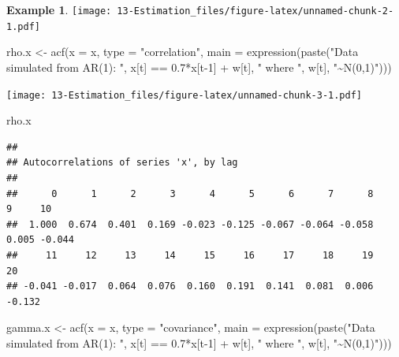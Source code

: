 \documentclass[
]{book}
\newenvironment{Shaded}{\begin{snugshade}}{\end{snugshade}}
\newcommand{\AttributeTok}[1]{\textcolor[rgb]{0.77,0.63,0.00}{#1}}
\newcommand{\DecValTok}[1]{\textcolor[rgb]{0.00,0.00,0.81}{#1}}
\newcommand{\FloatTok}[1]{\textcolor[rgb]{0.00,0.00,0.81}{#1}}
\newcommand{\FunctionTok}[1]{\textcolor[rgb]{0.00,0.00,0.00}{#1}}
\newcommand{\NormalTok}[1]{#1}
\newcommand{\OtherTok}[1]{\textcolor[rgb]{0.56,0.35,0.01}{#1}}
\newcommand{\SpecialCharTok}[1]{\textcolor[rgb]{0.00,0.00,0.00}{#1}}
\newcommand{\StringTok}[1]{\textcolor[rgb]{0.31,0.60,0.02}{#1}}
\theoremstyle{definition}
\theoremstyle{definition}
\newtheorem{example}{Example}[chapter]
\theoremstyle{definition}
\theoremstyle{definition}
\theoremstyle{remark}
\begin{document}
\begin{example}
\texttt{[image: 13-Estimation\_files/figure-latex/unnamed-chunk-2-1.pdf]}

\begin{Shaded}
\begin{Highlighting}[]
\NormalTok{rho.x }\OtherTok{\textless{}{-}} \FunctionTok{acf}\NormalTok{(}\AttributeTok{x =}\NormalTok{ x, }\AttributeTok{type =} \StringTok{"correlation"}\NormalTok{, }\AttributeTok{main =} 
    \FunctionTok{expression}\NormalTok{(}\FunctionTok{paste}\NormalTok{(}\StringTok{"Data simulated from AR(1): "}\NormalTok{, x[t] }\SpecialCharTok{==} \FloatTok{0.7}\SpecialCharTok{*}\NormalTok{x[t}\DecValTok{{-}1}\NormalTok{] }\SpecialCharTok{+}\NormalTok{ w[t], }\StringTok{" where "}\NormalTok{, w[t], }\StringTok{"\textasciitilde{}N(0,1)"}\NormalTok{)))}
\end{Highlighting}
\end{Shaded}

\texttt{[image: 13-Estimation\_files/figure-latex/unnamed-chunk-3-1.pdf]}

\begin{Shaded}
\begin{Highlighting}[]
\NormalTok{rho.x}
\end{Highlighting}
\end{Shaded}

\begin{verbatim}
## 
## Autocorrelations of series 'x', by lag
## 
##      0      1      2      3      4      5      6      7      8      9     10 
##  1.000  0.674  0.401  0.169 -0.023 -0.125 -0.067 -0.064 -0.058  0.005 -0.044 
##     11     12     13     14     15     16     17     18     19     20 
## -0.041 -0.017  0.064  0.076  0.160  0.191  0.141  0.081  0.006 -0.132
\end{verbatim}

\begin{Shaded}
\begin{Highlighting}[]
\NormalTok{gamma.x }\OtherTok{\textless{}{-}} \FunctionTok{acf}\NormalTok{(}\AttributeTok{x =}\NormalTok{ x, }\AttributeTok{type =} \StringTok{"covariance"}\NormalTok{, }\AttributeTok{main =} 
    \FunctionTok{expression}\NormalTok{(}\FunctionTok{paste}\NormalTok{(}\StringTok{"Data simulated from AR(1): "}\NormalTok{, }
\NormalTok{    x[t] }\SpecialCharTok{==} \FloatTok{0.7}\SpecialCharTok{*}\NormalTok{x[t}\DecValTok{{-}1}\NormalTok{] }\SpecialCharTok{+}\NormalTok{ w[t], }\StringTok{" where "}\NormalTok{, w[t], }\StringTok{"\textasciitilde{}N(0,1)"}\NormalTok{)))}
\end{Highlighting}
\end{Shaded}


\end{example}
\end{document}
